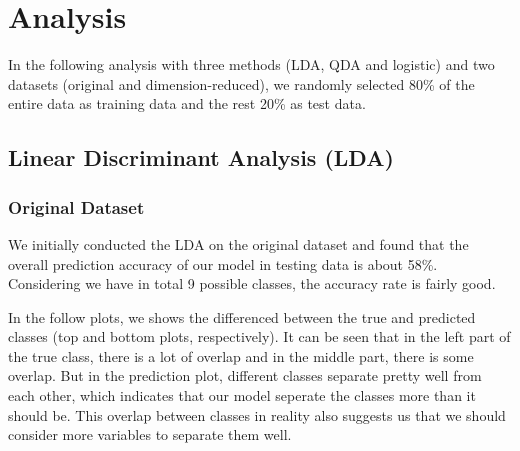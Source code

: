 \documentclass[]{article}
\begin{document}
\section{Analysis}\label{analysis}

In the following analysis with three methods (LDA, QDA and logistic) and
two datasets (original and dimension-reduced), we randomly selected 80\%
of the entire data as training data and the rest 20\% as test data.

\subsection{Linear Discriminant Analysis
(LDA)}\label{linear-discriminant-analysis-lda}

\subsubsection{Original Dataset}\label{original-dataset}

We initially conducted the LDA on the original dataset and found that
the overall prediction accuracy of our model in testing data is about
58\%. Considering we have in total 9 possible classes, the accuracy rate
is fairly good.

In the follow plots, we shows the differenced between the true and
predicted classes (top and bottom plots, respectively). It can be seen
that in the left part of the true class, there is a lot of overlap and
in the middle part, there is some overlap. But in the prediction plot,
different classes separate pretty well from each other, which indicates
that our model seperate the classes more than it should be. This overlap
between classes in reality also suggests us that we should consider more
variables to separate them well.
\end{document}
